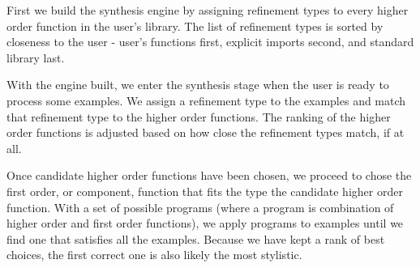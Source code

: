 First we build the synthesis engine by assigning refinement types to every higher order function in the user's library.
The list of refinement types is sorted by closeness to the user - user's functions first, explicit imports second, and standard library last.

With the engine built, we enter the synthesis stage when the user is ready to process some examples. 
We assign a refinement type to the examples and match that refinement type to the higher order functions.
The ranking of the higher order functions is adjusted based on how close the refinement types match, if at all.

Once candidate higher order functions have been chosen, we proceed to chose the first order, or component, function that fits the type the candidate higher order function.
With a set of possible programs (where a program is combination of higher order and first order functions), we apply programs to examples until we find one that satisfies all the examples.
Because we have kept a rank of best choices, the first correct one is also likely the most stylistic.
